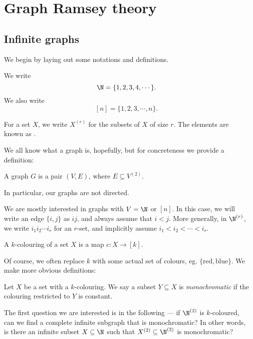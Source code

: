 \documentclass[a4paper]{article}
\begin{document}
\section{Graph Ramsey theory}
\subsection{Infinite graphs}
We begin by laying out some notations and definitions.
\begin{defi}\index{$\N$}\index{$[n]$}
  We write
  \[
    \N = \{1, 2, 3, 4, \cdots\}.
  \]
  We also write
  \[
    [n] = \{1, 2, 3, \cdots, n\}.
  \]
\end{defi}

\begin{notation}
  For a set $X$, we write $X^{(r)}$ for the subsets of $X$ of size $r$. The elements are known as .
\end{notation}

We all know what a graph is, hopefully, but for concreteness we provide a definition:
\begin{defi}[Graph]
  A graph $G$ is a pair $(V, E)$, where $E \subseteq V^{(2)}$.
\end{defi}
In particular, our graphs are not directed.

We are mostly interested in graphs with $V = \N$ or $[n]$. In this case, we will write an edge $\{i, j\}$ as $ij$, and always assume that $i < j$. More generally, in $\N^{(r)}$, we write $i_1 i_2 \cdots i_r$ for an $r$-set, and implicitly assume $i_1 < i_2 < \cdots < i_r$.

\begin{defi}[$k$-colouring]
  A $k$-colouring of a set $X$ is a map $c: X \to [k]$.
\end{defi}
Of course, we often replace $k$ with some actual set of colours, eg. $\{\mathrm{red}, \mathrm{blue}\}$. We make more obvious definitions:

\begin{defi}
  Let $X$ be a set with a $k$-colouring. We say a subset $Y \subseteq X$ is \emph{monochromatic} if the colouring restricted to $Y$ is constant.
\end{defi}

The first question we are interested is in the following --- if $\N^{(2)}$ is $k$-coloured, can we find a complete infinite subgraph that is monochromatic? In other words, is there an infinite subset $X \subseteq \N$ such that $X^{(2)} \subseteq \N^{(2)}$ is monochromatic?
\end{document}
